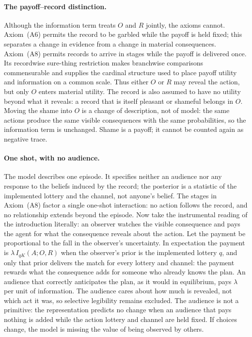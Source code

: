 \documentclass[11pt,a4paper]{article}
\theoremstyle{definition}
\newcommand{\I}{I}
\newcommand{\1}{\mathbf 1}
\begin{document}
\paragraph{The payoff--record distinction.}
Although the information term treats $O$ and $R$ jointly, the axioms cannot.  Axiom~\textup{(A6)} permits the
record to be garbled while the payoff is held fixed; this separates a change in evidence from a change in material
consequences.  Axiom~\textup{(A8)} permits records to arrive in stages while the payoff is delivered once.  Its
recordwise sure-thing restriction makes branchwise comparisons commensurable and supplies the cardinal structure used to
place payoff utility and information on a common scale.  Thus either $O$ or $R$ may reveal the action, but only
$O$ enters material utility.  The record is also assumed to have no utility beyond what it reveals: a record
that is itself pleasant or shameful belongs in $O$.  Moving the shame into $O$ is a change of description, not
of model: the same actions produce the same visible consequences with the same probabilities, so the
information term is unchanged.  Shame is a payoff; it cannot be counted again as negative trace.

\paragraph{One shot, with no audience.}
The model describes one episode.  It specifies neither an audience nor any response to the beliefs induced by
the record; the posterior is a statistic of the implemented lottery and the channel, not anyone's belief.  The
stages in Axiom~\textup{(A8)} factor a single one-shot interaction: no action follows the record, and no relationship
extends beyond the episode.  Now take the instrumental reading of the introduction literally: an observer
watches the visible consequence and pays the agent for what the consequence reveals about the action.  Let the
payment be proportional to the fall in the observer's uncertainty.  In expectation the payment is
$\lambda\,\I_{qK}(A;O,R)$ when the observer's prior is the implemented lottery $q$, and only that prior delivers
the match for every lottery and channel: the payment rewards what the consequence adds for someone who already
knows the plan.  An audience that correctly anticipates the plan, as it would in
equilibrium, pays $\lambda$ per unit of information.  The audience
cares about how much is revealed, not which act it was, so selective legibility remains excluded.  The audience
is not a primitive: the representation predicts no change when an audience that pays nothing is added while the action
lottery and channel are held fixed.  If choices change, the model is missing the value of being observed by
others.
\end{document}

